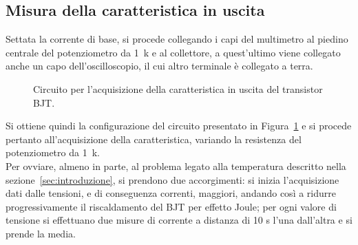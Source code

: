 \documentclass[../main.tex]{subfiles}
\begin{document}
    \subsection*{Misura della caratteristica in uscita}
    Settata la corrente di base, si procede collegando i capi del multimetro al piedino
    centrale del potenziometro da 1~k\textohm\; e al collettore, a quest'ultimo
    viene collegato anche un capo dell'oscilloscopio, il cui altro terminale è collegato a terra.
    \begin{figure}[h!]
        \centering
        
        \caption{Circuito per l'acquisizione della caratteristica in uscita del transistor BJT.}
        \label{fig:circuito-caratteristica}
    \end{figure}

    \noindent Si ottiene quindi la configurazione del circuito presentato in Figura~\ref{fig:circuito-caratteristica}
    e si procede pertanto all'acquisizione della caratteristica, variando la
    resistenza del potenziometro da 1~k\textohm. \\

    Per ovviare, almeno in parte, al problema legato alla
    temperatura descritto nella sezione~\ref{sec:introduzione},
    si prendono due accorgimenti:
    si inizia l'acquisizione dati dalle tensioni, e di
    conseguenza correnti, maggiori, andando così a ridurre
    progressivamente il riscaldamento del BJT per effetto Joule;
    per ogni valore di tensione si effettuano due misure
    di corrente a distanza di 10 s l'una dall'altra e si prende la
    media.\\
\end{document}
